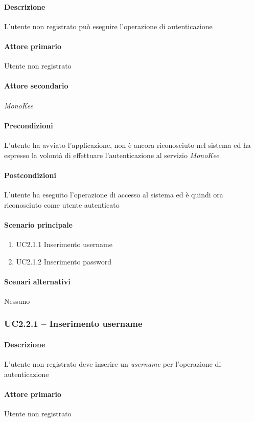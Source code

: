 \paragraph{Descrizione}  L’utente non registrato può eseguire l’operazione di autenticazione 
\paragraph{Attore primario}  Utente non registrato
\paragraph{Attore secondario}  \textit{MonoKee}
\paragraph{Precondizioni}  L’utente ha avviato l’applicazione, non è ancora riconosciuto nel sistema ed ha espresso la volontà di effettuare l’autenticazione al servizio \textit{MonoKee}
\paragraph{Postcondizioni}  L’utente ha eseguito l’operazione di accesso al sistema ed è quindi ora riconosciuto come utente autenticato
\paragraph{Scenario principale}  
    \begin{enumerate}
        \item UC2.1.1 Inserimento username
        \item UC2.1.2 Inserimento password
    \end{enumerate}
\paragraph{Scenari alternativi}  Nessuno


\subsubsection{UC2.2.1 – Inserimento username}
\paragraph{Descrizione}  L’utente non registrato deve inserire un \textit{username} per l’operazione di autenticazione
\paragraph{Attore primario}  Utente non registrato
